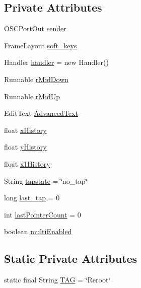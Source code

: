 \subsection*{\-Private \-Attributes}
\begin{DoxyCompactItemize}
\item 
\-O\-S\-C\-Port\-Out \hyperlink{classcom_1_1_cyberpad_1_1_reroot_1_1_pad_activity_a72b0bd50ef70b2453e04e6e6f5130fe5}{sender}
\item 
\-Frame\-Layout \hyperlink{classcom_1_1_cyberpad_1_1_reroot_1_1_pad_activity_a801798ab54b63c4ee8fc30025145c36a}{soft\-\_\-keys}
\item 
\-Handler \hyperlink{classcom_1_1_cyberpad_1_1_reroot_1_1_pad_activity_aa6011d078d89587d292834ff0a7ac18f}{handler} = new \-Handler()
\item 
\-Runnable \hyperlink{classcom_1_1_cyberpad_1_1_reroot_1_1_pad_activity_a7e3bf9e29b64feb300dbab2a1af52c51}{r\-Mid\-Down}
\item 
\-Runnable \hyperlink{classcom_1_1_cyberpad_1_1_reroot_1_1_pad_activity_a4b09f722b597e1e54319e0e26e167c19}{r\-Mid\-Up}
\item 
\-Edit\-Text \hyperlink{classcom_1_1_cyberpad_1_1_reroot_1_1_pad_activity_a851b313e564d538c3404e977c4501ebc}{\-Advanced\-Text}
\item 
float \hyperlink{classcom_1_1_cyberpad_1_1_reroot_1_1_pad_activity_ad73b0650c229503b19e6cb2ef3c97851}{x\-History}
\item 
float \hyperlink{classcom_1_1_cyberpad_1_1_reroot_1_1_pad_activity_a736c4fde23ae5a4950576b578f344896}{y\-History}
\item 
float \hyperlink{classcom_1_1_cyberpad_1_1_reroot_1_1_pad_activity_ac61a43ca02253d9d2bbc723c9deac58c}{x1\-History}
\item 
\-String \hyperlink{classcom_1_1_cyberpad_1_1_reroot_1_1_pad_activity_affebd6a37b77524e1976b2883f1fdf2f}{tapstate} = \char`\"{}no\-\_\-tap\char`\"{}
\item 
long \hyperlink{classcom_1_1_cyberpad_1_1_reroot_1_1_pad_activity_aae81ff7ae917fa64de02b1de1f30574d}{last\-\_\-tap} = 0
\item 
int \hyperlink{classcom_1_1_cyberpad_1_1_reroot_1_1_pad_activity_ab466e806825a25ccdbb41126ad816d14}{last\-Pointer\-Count} = 0
\item 
boolean \hyperlink{classcom_1_1_cyberpad_1_1_reroot_1_1_pad_activity_a935567dba20a71436b8448dd9e100283}{multi\-Enabled}
\end{DoxyCompactItemize}
\subsection*{\-Static \-Private \-Attributes}
\begin{DoxyCompactItemize}
\item 
static final \-String \hyperlink{classcom_1_1_cyberpad_1_1_reroot_1_1_pad_activity_a8ca938f81a28bf0a952da36f7f041c03}{\-T\-A\-G} = \char`\"{}\-Reroot\char`\"{}
\end{DoxyCompactItemize}


